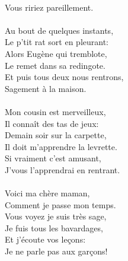 {\\Vous ririez pareillement.
\\\\Au bout de quelques instants,
\\Le p'tit rat sort en pleurant:
\\Alors Eugène qui tremblote,
\\Le remet dans sa redingote.
\\Et puis tous deux nous rentrons,
\\Sagement à la maison.
\\\\Mon cousin est merveilleux,
\\Il connaît des tas de jeux:
\\Demain soir sur la carpette,
\\Il doit m'apprendre la levrette.
\\Si vraiment c'est amusant,
\\J'vous l'apprendrai en rentrant.
\\\\Voici ma chère maman,
\\Comment je passe mon temps.
\\Vous voyez je suis très sage,
\\Je fuis tous les bavardages,
\\Et j'écoute vos leçons:
\\Je ne parle pas aux garçons!
}

\breakpage
